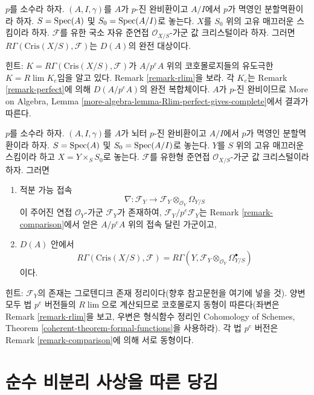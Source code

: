 \begin{remark}
\label{remark-complete-perfect}
$p$를 소수라 하자. $(A, I, \gamma)$를 $A$가 $p$-진 완비환이고
$A/I$에서 $p$가 멱영인 분할멱환이라 하자. $S = \mathop{\mathrm{Spec}}(A)$ 및
$S_0 = \mathop{\mathrm{Spec}}(A/I)$로 놓는다. $X$를 $S_0$ 위의 고유 매끄러운
스킴이라 하자. $\mathcal{F}$를 유한 국소 자유 준연접
$\mathcal{O}_{X/S}$-가군 값 크리스털이라 하자. 그러면
$R\Gamma(\text{Cris}(X/S), \mathcal{F})$는 $D(A)$의 완전 대상이다.

\medskip\noindent
힌트: $K = R\Gamma(\text{Cris}(X/S), \mathcal{F})$가
$A/p^eA$ 위의 코호몰로지들의 유도극한 $K = R\lim K_e$임을 알고 있다.
Remark \ref{remark-rlim}을 보라. 각 $K_e$는 Remark
\ref{remark-perfect}에 의해 $D(A/p^eA)$의 완전 복합체이다. $A$가
$p$-진 완비이므로 More on Algebra, Lemma
\ref{more-algebra-lemma-Rlim-perfect-gives-complete}에서 결과가 따른다.
\end{remark}

\begin{remark}[완비 상황의 비교]
\label{remark-complete-comparison}
$p$를 소수라 하자. $(A, I, \gamma)$를 $A$가 뇌터 $p$-진 완비환이고
$A/I$에서 $p$가 멱영인 분할멱환이라 하자. $S = \mathop{\mathrm{Spec}}(A)$ 및
$S_0 = \mathop{\mathrm{Spec}}(A/I)$로 놓는다. $Y$를 $S$ 위의 고유 매끄러운 스킴이라
하고 $X = Y \times_S S_0$로 놓는다. $\mathcal{F}$를 유한형 준연접
$\mathcal{O}_{X/S}$-가군 값 크리스털이라 하자. 그러면
\begin{enumerate}
\item 적분 가능 접속
$$
\nabla :
\mathcal{F}_Y
\longrightarrow
\mathcal{F}_Y \otimes_{\mathcal{O}_Y} \Omega_{Y/S}
$$
이 주어진 연접 $\mathcal{O}_Y$-가군 $\mathcal{F}_Y$가 존재하여,
$\mathcal{F}_Y/p^e\mathcal{F}_Y$는 Remark \ref{remark-comparison}에서
얻은 $A/p^eA$ 위의 접속 달린 가군이고,
\item $D(A)$ 안에서
$$
R\Gamma(\text{Cris}(X/S), \mathcal{F}) =
R\Gamma(Y, \mathcal{F}_Y \otimes_{\mathcal{O}_Y} \Omega^\bullet_{Y/S})
$$
이다.
\end{enumerate}
힌트: $\mathcal{F}_Y$의 존재는 그로텐디크 존재 정리이다(향후 참고문헌을
여기에 넣을 것). 양변 모두 법 $p^e$ 버전들의 $R\lim$으로 계산되므로
코호몰로지 동형이 따른다(좌변은 Remark \ref{remark-rlim}을 보고,
우변은 형식함수 정리인 Cohomology of Schemes, Theorem
\ref{coherent-theorem-formal-functions}을 사용하라). 각 법 $p^e$ 버전은
Remark \ref{remark-comparison}에 의해 서로 동형이다.
\end{remark}




\section{순수 비분리 사상을 따른 당김}
\label{section-pull-back-along-pth-root}

